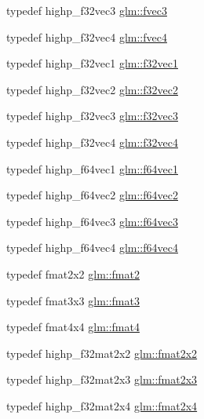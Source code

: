\begin{DoxyCompactItemize}
\item 
typedef highp\-\_\-f32vec3 \hyperlink{group__gtc__type__precision_ga8480fdaa7fb8e177e57b367be79863d8}{glm\-::fvec3}
\item 
typedef highp\-\_\-f32vec4 \hyperlink{group__gtc__type__precision_ga396c4084cd7e5465f8b56035e0420c3e}{glm\-::fvec4}
\item 
typedef highp\-\_\-f32vec1 \hyperlink{group__gtc__type__precision_ga6fb588b465f2252b473582159c31c40c}{glm\-::f32vec1}
\item 
typedef highp\-\_\-f32vec2 \hyperlink{group__gtc__type__precision_ga8681dee3524dea86388178c49c27079a}{glm\-::f32vec2}
\item 
typedef highp\-\_\-f32vec3 \hyperlink{group__gtc__type__precision_gab550330e62a7bc3fa9e6740b9421037c}{glm\-::f32vec3}
\item 
typedef highp\-\_\-f32vec4 \hyperlink{group__gtc__type__precision_ga6848e3b5cb5c1f4c117717b309e726eb}{glm\-::f32vec4}
\item 
typedef highp\-\_\-f64vec1 \hyperlink{group__gtc__type__precision_ga4c945cd13adbebd25ea3df003efb92ef}{glm\-::f64vec1}
\item 
typedef highp\-\_\-f64vec2 \hyperlink{group__gtc__type__precision_gacde4fe7b129521888cd30672c34650c5}{glm\-::f64vec2}
\item 
typedef highp\-\_\-f64vec3 \hyperlink{group__gtc__type__precision_gac531875c6544b7919f36a86cbe538736}{glm\-::f64vec3}
\item 
typedef highp\-\_\-f64vec4 \hyperlink{group__gtc__type__precision_ga9d896f484039b22873e7bfb9e06f7b47}{glm\-::f64vec4}
\item 
typedef fmat2x2 \hyperlink{group__gtc__type__precision_gab8e1ce0a2648cfcd645eed2d8ea96f21}{glm\-::fmat2}
\item 
typedef fmat3x3 \hyperlink{group__gtc__type__precision_ga17dec8b2e3d19b235b0749b8ac9f2217}{glm\-::fmat3}
\item 
typedef fmat4x4 \hyperlink{group__gtc__type__precision_ga5a7b9713c32b3e8bf6ad41fce25f3205}{glm\-::fmat4}
\item 
typedef highp\-\_\-f32mat2x2 \hyperlink{group__gtc__type__precision_ga20fdbcc6b16bed27ad25db9b71d09e93}{glm\-::fmat2x2}
\item 
typedef highp\-\_\-f32mat2x3 \hyperlink{group__gtc__type__precision_ga80f463bcb7e5008c11af5fdbc52c0045}{glm\-::fmat2x3}
\item 
typedef highp\-\_\-f32mat2x4 \hyperlink{group__gtc__type__precision_ga76578ee3c2d6de9b46d0efd1c7060b85}{glm\-::fmat2x4}

\end{DoxyCompactItemize}
